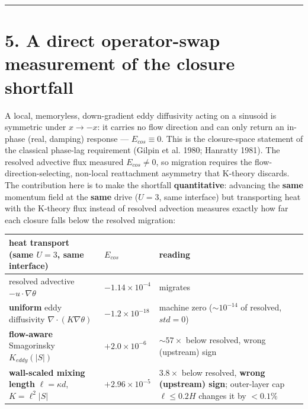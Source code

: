 \documentclass{jfm}
\begin{document}
\medskip\hrule\medskip


\section*{5. A direct operator-swap measurement of the closure shortfall}


A local, memoryless, down-gradient eddy diffusivity acting on a sinusoid is symmetric under $x\to -x$: it carries no flow direction and can only return an in-phase (real, damping) response — $E_{cos}\equiv 0$. This is the closure-space statement of the classical phase-lag requirement (Gilpin et al. 1980; Hanratty 1981). The resolved advective flux measured $E_{cos}\ne 0$, so migration requires the flow-direction-selecting, non-local reattachment asymmetry that K-theory discards. The contribution here is to make the shortfall \textbf{quantitative}: advancing the \textbf{same} momentum field at the \textbf{same} drive ($U=3$, same interface) but transporting heat with the K-theory flux instead of resolved advection measures exactly how far each closure falls below the resolved migration:


\begin{center}\small
\begin{tabularx}{\linewidth}{>{\raggedright\arraybackslash}X>{\raggedright\arraybackslash}X>{\raggedright\arraybackslash}X}
\toprule
heat transport (same $U=3$, same interface) & $E_{cos}$ & reading \\
\midrule
resolved advective $-u\cdot \nabla \theta $ & $-1.14\times 10^{-4}$ & migrates \\
\textbf{uniform} eddy diffusivity $\nabla \cdot (K\nabla \theta )$ & $-1.2\times 10^{-18}$ & machine zero ($\sim 10^{-14}$ of resolved, $std=0$) \\
\textbf{flow-aware} Smagorinsky $K_{eddy}(|S|)$ & $+2.0\times 10^{-6}$ & $\sim 57\times $ below resolved, wrong (upstream) sign \\
\textbf{wall-scaled mixing length} $\ell =\kappa d$, $K=\ell ^{2}|S|$ & $+2.96\times 10^{-5}$ & $3.8\times $ below resolved, \textbf{wrong (upstream) sign}; outer-layer cap $\ell \le 0.2H$ changes it by $<0.1\%$ \\
\bottomrule
\end{tabularx}
\end{center}
\end{document}

